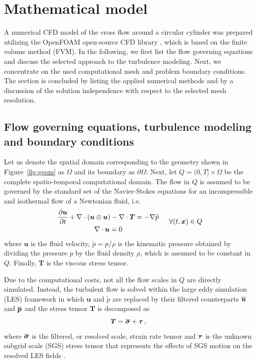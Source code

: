 \section{Mathematical model}
\label{sec:model}
A numerical CFD model of the cross flow around a circular cylinder was prepared utilizing the OpenFOAM open-source CFD library \citep{OpenFOAM2007}, which is based on the finite volume method (FVM). In the following, we first list the flow governing equations and discuss the selected approach to the turbulence modeling. Next, we concentrate on the used computational mesh and problem boundary conditions. The section is concluded by listing the applied numerical methods and by a discussion of the solution independence with respect to the selected mesh resolution.

\subsection{Flow governing equations, turbulence modeling and boundary conditions}
\label{sub:flowEqs}
Let us denote the spatial domain corresponding to the geometry shown in Figure~\ref{fig:geom} as $\Omega$ and its boundary as $\partial\Omega$. Next, let $Q = (0,T]\times \Omega$ be the complete spatio-temporal computational domain. The flow in $Q$ is assumed to be governed by the standard set of the Navier-Stokes equations for an incompressible and isothermal flow of a Newtonian fluid, i.e.
\begin{equation}
\label{eq:nsEqs}
    \begin{array}{*1{>{\displaystyle}c}}
        \frac{\partial \bm{u}}{\partial t} + \nabla \cdot \left( \bm{u} \otimes \bm{u}\right) - \nabla \cdot \bm{T} = -\nabla \tilde{p} \\[0.2cm]
        \nabla \cdot \bm{u} = 0
    \end{array}\quad \forall (t,\bm{x})\in Q
\end{equation}
where $\bm{u}$ is the fluid velocity, $\tilde{p} = p/\rho$ is the kinematic pressure obtained by dividing the pressure $p$ by the fluid density $\rho$, which is assumed to be constant in $Q$. Finally, $\bm{T}$ is the viscous stress tensor.

Due to the computational costs, not all the flow scales in $Q$ are directly simulated. Instead, the turbulent flow is solved within the large eddy simulation (LES) framework in which $\bm{u}$ and $\tilde{p}$ are replaced by their filtered counterparts $\overline{\bm{u}}$ and $\overline{\bm{p}}$ and the stress tensor $\bm{T}$ is decomposed as 
\begin{equation}
\label{eq:stress}
    \bm{T} = \overline{\bm{\sigma}} + \bm{\tau}\,,
\end{equation}
where $\overline{\bm{\sigma}}$ is the filtered, or resolved scale, strain rate tensor and $\bm{\tau}$ is the unknown subgrid scale (SGS) stress tensor that represents the effects of SGS motion on the resolved LES fields \citep{yang2015}.

